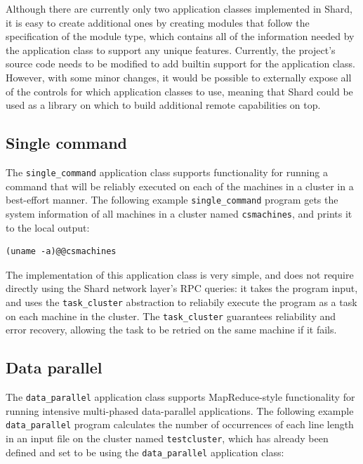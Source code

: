 \documentclass[twoside]{report}
\begin{document}
Although there are currently only two application classes implemented in Shard, it is easy to create additional ones by creating modules that follow the specification of the module type, which contains all of the information needed by the application class to support any unique features.
Currently, the project's source code needs to be modified to add builtin support for the application class. However, with some minor changes, it would be possible to externally expose all of the controls for which application classes to use, meaning that Shard could be used as a library on which to build additional remote capabilities on top.

\subsection{Single command}

\begin{sloppypar}
  The \texttt{single\_command} application class supports functionality for running a command that will be reliably executed on each of the machines in a cluster in a best-effort manner. The following example \texttt{single\_command} program gets the system information of all machines in a cluster named \texttt{csmachines}, and prints it to the local output:
\end{sloppypar}

\begin{minipage}[c]{\textwidth-15pt}
  \begin{lstlisting}
(uname -a)@@csmachines 
\end{lstlisting}
  \smallskip
\end{minipage}

\begin{sloppypar}
  The implementation of this application class is very simple, and does not require directly using the Shard network layer's RPC queries: it takes the program input, and uses the \texttt{task\_cluster} abstraction to reliabily execute the program as a task on each machine in the cluster.
  The \texttt{task\_cluster} guarantees reliability and error recovery, allowing the task to be retried on the same machine if it fails.
\end{sloppypar}

\subsection{Data parallel}

The \texttt{data\_parallel} application class supports MapReduce-style functionality for running intensive multi-phased data-parallel applications.
The following example \texttt{data\_parallel} program calculates the number of occurrences of each line length in an input file on the cluster named \texttt{testcluster}, which has already been defined and set to be using the \texttt{data\_parallel} application class:
\end{document}
